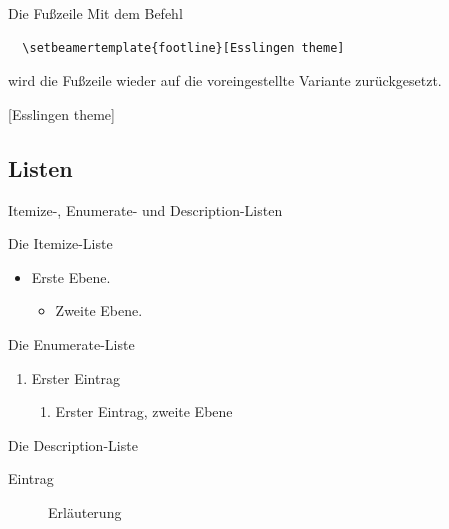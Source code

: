 % 

\begin{frame}[fragile]{Die Fußzeile}
  Mit dem Befehl
\begin{verbatim}
  \setbeamertemplate{footline}[Esslingen theme]
\end{verbatim}
  wird die Fußzeile wieder auf die voreingestellte Variante zurückgesetzt.
\end{frame}

[Esslingen theme]

\subsection{Listen}

\begin{frame}{Itemize-, Enumerate- und Description-Listen}

Die Itemize-Liste
    \begin{itemize}
      \item Erste Ebene.
       \begin{itemize}
        \item Zweite Ebene.
       \end{itemize}
    \end{itemize}

Die Enumerate-Liste
  \begin{enumerate}
   \item Erster Eintrag
    \begin{enumerate}
     \item Erster Eintrag, zweite Ebene
    \end{enumerate}
  \end{enumerate}

Die Description-Liste
  \begin{description}
  \item[Eintrag] Erläuterung
  \end{description}

\end{frame}

